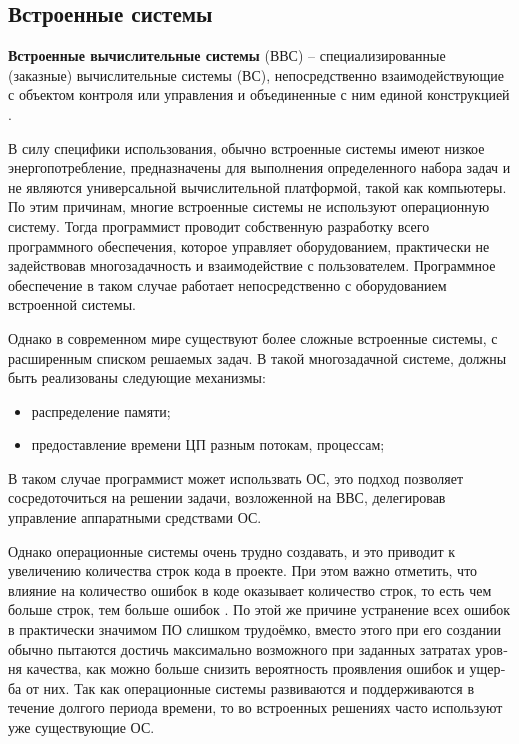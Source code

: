 \subsection{Встроенные системы}
\label{subsec:linux-for-embedded-systems}

\textbf{Встроенные вычислительные системы} (ВВС) – специализированные (заказные) вычислительные системы (ВС), непосредственно взаимодействующие с объектом контроля или управления и объединенные с ним единой конструкцией \cite{EMBEDDED}.

В силу специфики использования, обычно встроенные системы имеют низкое энергопотребление, предназначены для выполнения определенного набора задач и не являются универсальной вычислительной платформой, такой как компьютеры. По этим причинам, многие встроенные системы не используют операционную систему. Тогда программист проводит собственную разработку всего программного обеспечения, которое управляет оборудованием, практически не задействовав многозадачность и взаимодействие с пользователем. Программное обеспечение в таком случае работает непосредственно с оборудованием встроенной системы.

Однако в современном мире существуют более сложные встроенные системы, с расширенным списком решаемых задач.
В такой многозадачной системе, должны быть реализованы следующие механизмы:
\begin{itemize}
  \item распределение памяти;
  \item предоставление времени ЦП разным потокам, процессам;
\end{itemize}

В таком случае программист может использвать ОС, это подход позволяет сосредоточиться на решении задачи, возложенной на ВВС, делегировав управление аппаратными средствами ОС.

Однако операционные системы очень трудно создавать, и это приводит к увеличению количества строк кода в проекте.
При этом важно отметить, что влияние на количество ошибок в коде оказывает количество строк, то есть чем больше строк, тем больше ошибок \cite{EMBEDDED}.
По этой же причине уст­ра­не­ние всех оши­бок в прак­ти­че­ски зна­чи­мом ПО слиш­ком тру­до­ём­ко, вме­сто это­го при его соз­да­нии обыч­но пы­та­ют­ся дос­тичь мак­си­маль­но воз­мож­но­го при за­дан­ных за­тра­тах уров­ня ка­че­ст­ва, как мож­но боль­ше сни­зить ве­ро­ят­ность про­яв­ле­ния оши­бок и ущер­ба от них.
Так как операционные системы развиваются и поддерживаются в течение долгого периода времени\cite{TANENBAUM}, то во встроенных решениях часто используют уже существующие ОС.

